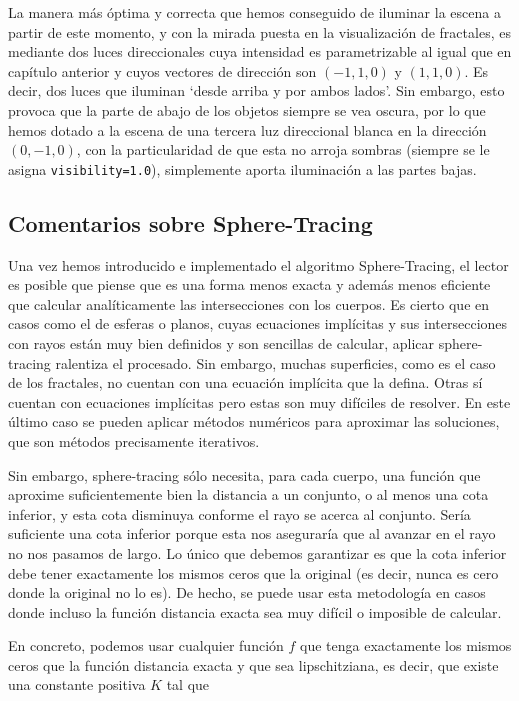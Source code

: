 La manera más óptima y correcta que hemos conseguido de iluminar la escena a partir de este momento, y con la mirada puesta en la visualización de fractales, es mediante dos luces direccionales cuya intensidad es parametrizable al igual que en capítulo anterior y cuyos vectores de dirección son $(-1,1,0)$ y $(1,1,0)$. Es decir, dos luces que iluminan `desde arriba y por ambos lados'. Sin embargo, esto provoca que la parte de abajo de los objetos siempre se vea oscura, por lo que hemos dotado a la escena de una tercera luz direccional blanca en la dirección $(0,-1,0)$, con la particularidad de que esta no arroja sombras (siempre se le asigna \verb|visibility=1.0|), simplemente aporta iluminación a las partes bajas.

\subsection{Comentarios sobre Sphere-Tracing}
\label{subsection:comentarios}

Una vez hemos introducido e implementado el algoritmo Sphere-Tracing, el lector es posible que piense que es una forma menos exacta y además menos eficiente que calcular analíticamente las intersecciones con los cuerpos. Es cierto que en casos como el de esferas o planos, cuyas ecuaciones implícitas y sus intersecciones con rayos están muy bien definidos y son sencillas de calcular, aplicar sphere-tracing ralentiza el procesado. Sin embargo, muchas superficies, como es el caso de los fractales, no cuentan con una ecuación implícita que la defina. Otras sí cuentan con ecuaciones implícitas pero estas son muy difíciles de resolver. En este último caso se pueden aplicar métodos numéricos para aproximar las soluciones, que son métodos precisamente iterativos. 

Sin embargo, sphere-tracing sólo necesita, para cada cuerpo, una función que aproxime suficientemente bien la distancia a un conjunto, o al menos una cota inferior, y esta cota disminuya conforme el rayo se acerca al conjunto. Sería suficiente una cota inferior porque esta nos aseguraría que al avanzar en el rayo no nos pasamos de largo. Lo único que debemos garantizar es que la cota inferior debe tener exactamente los mismos ceros que la original (es decir, nunca es cero donde la original no lo es). De hecho, se puede usar esta metodología en casos donde incluso la función distancia exacta sea muy difícil o imposible de calcular.

En concreto, podemos usar cualquier función $f$ que tenga exactamente los mismos ceros que la función distancia exacta y que sea lipschitziana, es decir, que existe una constante positiva $K$ tal que

